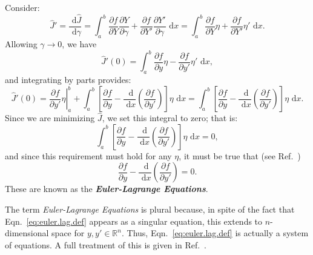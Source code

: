 \begin{definition}
Consider:
\begin{equation}
\hat J' = \frac{\text{ d}\hat J}{\text{ d} \gamma} = \int_a^b{\frac{\partial f}{\partial Y}\frac{\partial Y}{\partial \gamma}+\frac{\partial f}{\partial Y'}\frac{\partial Y'}{\partial \gamma}}\text{ d}x = \int_a^b{\frac{\partial f}{\partial Y}\eta+\frac{\partial f}{\partial Y'}\eta'}\text{ d}x.
\end{equation}
Allowing $\gamma\to 0$, we have
\begin{equation}
\hat J'(0) = \int_a^b{\frac{\partial f}{\partial y}\eta-\frac{\partial f}{\partial y'}\eta'}\text{ d}x,
\end{equation}
and integrating by parts provides:
\begin{equation}
 \hat J'(0) = \left.\frac{\partial f}{\partial y'}\eta\right|_a^b +\int_a^b{\left[\frac{\partial f}{\partial y}-\frac{\text{ d}}{\text{ d}x}\left(\frac{\partial f}{\partial y'}\right)\right]}\eta\text{ d}x = \int_a^b{\left[\frac{\partial f}{\partial y}-\frac{\text{ d}}{\text{ d}x}\left(\frac{\partial f}{\partial y'}\right)\right]}\eta\text{ d}x.
 \end{equation}
Since we are minimizing $\hat J$, we set this integral to zero; that is:
\begin{equation}
\int_a^b{\left[\frac{\partial f}{\partial y}-\frac{\text{ d}}{\text{ d}x}\left(\frac{\partial f}{\partial y'}\right)\right]}\eta\text{ d}x = 0,
\end{equation}
and since this requirement must hold for any $\eta$, it must be true that (see Ref.~\cite{weinstock1974calculus}) 
\begin{equation}
\frac{\partial f}{\partial y}-\frac{\text{ d}}{\text{ d}x}\left(\frac{\partial f}{\partial y'}\right) = 0.
\label{eq:euler.lag.def}
\end{equation}
These are known as the \emph{\textbf{Euler-Lagrange Equations}}.
\end{definition}
The term \emph{Euler-Lagrange Equations} is plural because, in spite of the fact that Eqn.~\ref{eq:euler.lag.def} appears as a singular equation, this extends to $n$-dimensional space for $y,y'\in\mathbb R^n$. Thus, Eqn.~\ref{eq:euler.lag.def} is actually a system of equations. A full treatment of this is given in Ref.~\cite{cornelius1970variational}.

